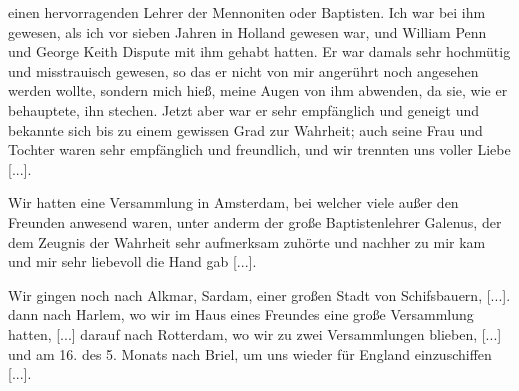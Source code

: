 einen hervorragenden Lehrer der 
Mennoniten oder Baptisten.
Ich war bei ihm gewesen, als ich vor sieben Jahren in Holland
gewesen war, und William Penn 
und George Keith Dispute
mit ihm gehabt hatten. Er war damals sehr hochmütig und
misstrauisch gewesen, so das er nicht von mir angerührt noch
angesehen werden wollte, sondern mich hieß, meine Augen von
ihm abwenden, da sie, wie er behauptete, ihn stechen. Jetzt aber
war er sehr empfänglich und geneigt und bekannte sich bis zu
einem gewissen Grad zur Wahrheit; auch seine Frau und Tochter
waren sehr empfänglich und freundlich, und wir trennten uns
voller Liebe [...].

Wir hatten eine Versammlung in Amsterdam, bei welcher
viele außer den Freunden anwesend waren, unter anderm der
große Baptistenlehrer Galenus, der dem Zeugnis der Wahrheit
sehr aufmerksam zuhörte und nachher zu mir kam und mir sehr
liebevoll die Hand gab [...].

Wir gingen noch nach Alkmar, Sardam, einer großen Stadt
von Schifsbauern, [...]. dann nach Harlem, wo wir im Haus
eines Freundes eine große Versammlung hatten, [...] darauf nach
Rotterdam, wo wir zu zwei Versammlungen blieben, [...] und
am 16. des 5. Monats nach Briel, um uns wieder für England
einzuschiffen [...].

